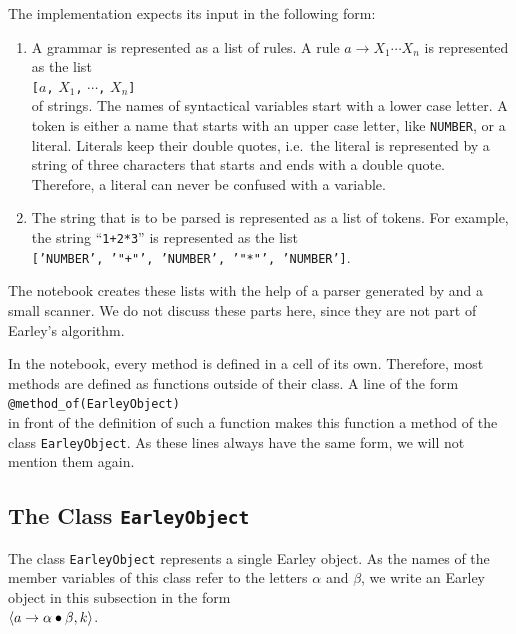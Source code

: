 The implementation expects its input in the following form:
\begin{enumerate}
\item A grammar is represented as a list of rules.  A rule $a \rightarrow X_1 \cdots X_n$ is represented as the list
      \\[0.2cm]
      \hspace*{1.3cm}
      \texttt{[}$a$\texttt{,} $X_1$\texttt{,} $\cdots$\texttt{,} $X_n$\texttt{]}
      \\[0.2cm]
      of strings.  The names of syntactical variables start with a lower case letter.  A token is either a name that
      starts with an upper case letter, like \texttt{NUMBER}, or a literal.  Literals keep their double quotes,
      i.e.~the literal \squoted{+} is represented by a string of three characters that starts and ends with a double
      quote.  Therefore, a literal can never be confused with a variable.
\item The string that is to be parsed is represented as a list of tokens.  For example, the string
      ``\texttt{1+2*3}'' is represented as the list
      \\[0.2cm]
      \hspace*{1.3cm}
      \texttt{['NUMBER', '"+"', 'NUMBER', '"*"', 'NUMBER']}.
\end{enumerate}
The notebook creates these lists with the help of a parser generated by  and a small scanner.
We do not discuss these parts here, since they are not part of Earley's algorithm.

In the notebook, every method is defined in a cell of its own.  Therefore, most methods are defined as functions
outside of their class.  A line of the form
\\[0.2cm]
\hspace*{1.3cm}
\texttt{@method\_of(EarleyObject)}
\\[0.2cm]
in front of the definition of such a function makes this function a method of the class \texttt{EarleyObject}.  As
these lines always have the same form, we will not mention them again.

\subsection{The Class \texttt{EarleyObject}\label{section:earley-object}}
The class \texttt{EarleyObject} represents a single Earley object.  As the names of the member variables of this
class refer to the letters $\alpha$ and $\beta$, we write an Earley object in this subsection in the form
\\[0.2cm]
\hspace*{1.3cm}
$\pair(a \rightarrow \alpha \mdot \beta, k)$.

